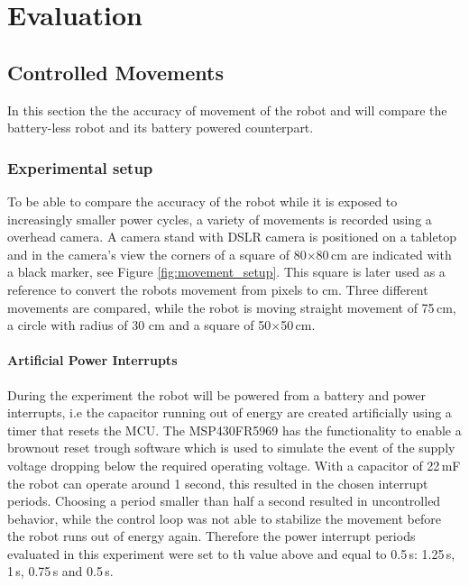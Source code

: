 \chapter{Evaluation} 

\section{Controlled Movements}
\label{sec:controlled_movements}




In this section the the accuracy of movement of the robot and will compare the battery-less robot and its battery powered counterpart.

\subsection{Experimental setup}

To be able to compare the accuracy of the robot while it is exposed to increasingly smaller power cycles, a variety of movements is recorded using a overhead camera.
A camera stand with DSLR camera is positioned on a tabletop and in the camera's view the corners of a square of 80$\times$80\,cm are indicated with a black marker, see Figure \ref{fig:movement_setup}.
This square is later used as a reference to convert the robots movement from pixels to cm.
Three different movements are compared, while the robot is moving straight movement of 75\,cm, a circle with radius of 30 cm and a square of 50$\times$50\,cm.

\subsubsection{Artificial Power Interrupts}

During the experiment the robot will be powered from a battery and power interrupts, i.e the capacitor running out of energy are created artificially using a timer that resets the MCU.
The MSP430FR5969 has the functionality to enable a brownout reset trough software which is used to simulate the event of the supply voltage dropping below the required operating voltage.
With a capacitor of 22\,mF the robot can operate around 1 second, this resulted in the chosen interrupt periods.
Choosing a period smaller than half a second resulted in uncontrolled behavior, while the control loop was not able to stabilize the movement before the robot runs out of energy again.
Therefore the power interrupt periods evaluated in this experiment were set to th value above and equal to 0.5\,s: 1.25\,s, 1\,s, 0.75\,s and 0.5\,s.

